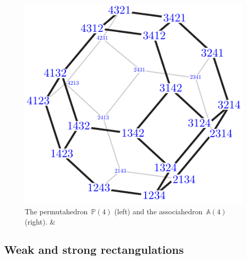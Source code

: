 \documentclass{amsart}
\theoremstyle{definition}
\newcommand{\polytope}[1]{\mathds{#1}} %
\newcommand{\Perm}{\polytope{P}} %
\newcommand{\Asso}{\polytope{A}} %
\begin{document}
\begin{figure}
	\capstart
	\centerline{\includegraphics[scale=.6]{permutahedronLeft4} \qquad {}}
	\caption{The permutahedron~$\Perm(4)$ (left) and the associahedron~$\Asso(4)$ (right). \cite[Fig.~1]{MR3964495} \&~\cite[Fig.~5]{MR4584712}}
	\label{fig:quotientopes}
\end{figure}

\subsection{Weak and strong rectangulations}
\end{document}
